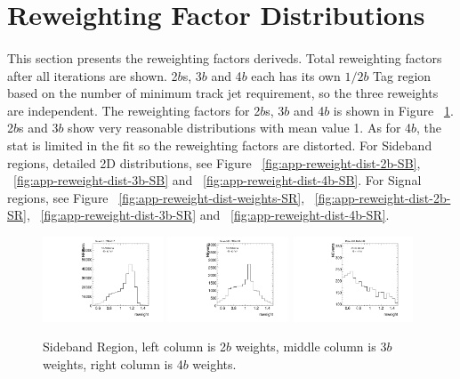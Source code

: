 \section{Reweighting Factor Distributions }
\label{app:reweight-dist}

\paragraph{}
This section presents the reweighting factors deriveds. Total reweighting factors after all iterations are shown. 2$b$s, 3$b$ and 4$b$ each has its own $1/2b$ Tag region based on the number of minimum track jet requirement, so the three reweights are independent. The reweighting factors for 2$b$s, 3$b$ and 4$b$ is shown in Figure ~\ref{fig:app-reweight-dist-weights-SB}. 2$b$s and 3$b$ show very reasonable distributions with mean value 1. As for 4$b$, the stat is limited in the fit so the reweighting factors are distorted. For Sideband regions, detailed 2D distributions, see Figure ~\ref{fig:app-reweight-dist-2b-SB}, ~\ref{fig:app-reweight-dist-3b-SB} and ~\ref{fig:app-reweight-dist-4b-SB}. For Signal regions, see Figure ~\ref{fig:app-reweight-dist-weights-SR}, ~\ref{fig:app-reweight-dist-2b-SR}, ~\ref{fig:app-reweight-dist-3b-SR} and ~\ref{fig:app-reweight-dist-4b-SR}.

\begin{figure}[htbp!]
\begin{center}
\includegraphics[angle=270, width=0.32\textwidth]{./figures/boosted/AppendixReweight/Weights/2Trk_split_Sideband_leadHCand_Pt_m_weight_projy.pdf}
\includegraphics[angle=270, width=0.32\textwidth]{./figures/boosted/AppendixReweight/Weights/3Trk_Sideband_leadHCand_Pt_m_weight_projy.pdf}
\includegraphics[angle=270, width=0.32\textwidth]{./figures/boosted/AppendixReweight/Weights/4Trk_Sideband_leadHCand_Pt_m_weight_projy.pdf}\\
\caption{Sideband Region, left column is 2$b$ weights, middle column is 3$b$ weights, right column is 4$b$ weights.}
\label{fig:app-reweight-dist-weights-SB}
\end{center}
\end{figure}


